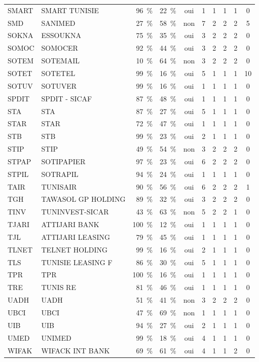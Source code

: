 \begin{longtable}{llrrcccccc}
SMART & SMART TUNISIE & 96~\% & 22~\% & oui & 1 & 1 & 1 & 1 & 0 \\
SMD & SANIMED & 27~\% & 58~\% & non & 7 & 2 & 2 & 2 & 5 \\
SOKNA & ESSOUKNA & 75~\% & 35~\% & oui & 3 & 2 & 2 & 2 & 0 \\
SOMOC & SOMOCER & 92~\% & 44~\% & oui & 3 & 2 & 2 & 2 & 0 \\
SOTEM & SOTEMAIL & 10~\% & 64~\% & non & 3 & 2 & 2 & 2 & 0 \\
SOTET & SOTETEL & 99~\% & 16~\% & oui & 5 & 1 & 1 & 1 & 10 \\
SOTUV & SOTUVER & 99~\% & 16~\% & oui & 1 & 1 & 1 & 1 & 0 \\
SPDIT & SPDIT - SICAF & 87~\% & 48~\% & oui & 1 & 1 & 1 & 1 & 0 \\
STA & STA & 87~\% & 27~\% & oui & 5 & 1 & 1 & 1 & 0 \\
STAR & STAR & 72~\% & 47~\% & oui & 1 & 1 & 1 & 1 & 0 \\
STB & STB & 99~\% & 23~\% & oui & 2 & 1 & 1 & 1 & 0 \\
STIP & STIP & 49~\% & 54~\% & non & 3 & 2 & 2 & 2 & 0 \\
STPAP & SOTIPAPIER & 97~\% & 23~\% & oui & 6 & 2 & 2 & 2 & 0 \\
STPIL & SOTRAPIL & 94~\% & 24~\% & oui & 1 & 1 & 1 & 1 & 0 \\
TAIR & TUNISAIR & 90~\% & 56~\% & oui & 6 & 2 & 2 & 2 & 1 \\
TGH & TAWASOL GP HOLDING & 89~\% & 32~\% & oui & 3 & 2 & 2 & 2 & 0 \\
TINV & TUNINVEST-SICAR & 43~\% & 63~\% & non & 5 & 2 & 2 & 1 & 0 \\
TJARI & ATTIJARI BANK & 100~\% & 12~\% & oui & 1 & 1 & 1 & 1 & 0 \\
TJL & ATTIJARI LEASING & 79~\% & 45~\% & oui & 1 & 1 & 1 & 1 & 0 \\
TLNET & TELNET HOLDING & 99~\% & 16~\% & oui & 2 & 1 & 1 & 1 & 0 \\
TLS & TUNISIE LEASING F & 86~\% & 30~\% & oui & 5 & 1 & 1 & 1 & 0 \\
TPR & TPR & 100~\% & 16~\% & oui & 1 & 1 & 1 & 1 & 0 \\
TRE & TUNIS RE & 81~\% & 46~\% & oui & 1 & 1 & 1 & 1 & 0 \\
UADH & UADH & 51~\% & 41~\% & non & 3 & 2 & 2 & 2 & 0 \\
UBCI & UBCI & 47~\% & 69~\% & non & 1 & 1 & 1 & 1 & 0 \\
UIB & UIB & 94~\% & 27~\% & oui & 2 & 1 & 1 & 1 & 0 \\
UMED & UNIMED & 99~\% & 18~\% & oui & 4 & 1 & 1 & 1 & 0 \\
WIFAK & WIFACK INT BANK & 69~\% & 61~\% & oui & 4 & 1 & 1 & 2 & 0 \\
\end{longtable}